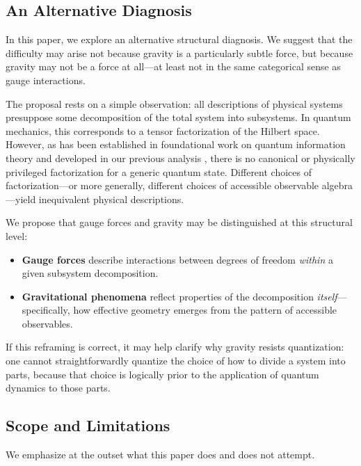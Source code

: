 \documentclass[12pt,a4paper]{article}
\begin{document}
\subsection{An Alternative Diagnosis}

In this paper, we explore an alternative structural diagnosis. We suggest that the difficulty may arise not because gravity is a particularly subtle force, but because gravity may not be a force at all—at least not in the same categorical sense as gauge interactions.

The proposal rests on a simple observation: all descriptions of physical systems presuppose some decomposition of the total system into subsystems. In quantum mechanics, this corresponds to a tensor factorization of the Hilbert space. However, as has been established in foundational work on quantum information theory \cite{Zanardi2001,Zanardi2004} and developed in our previous analysis \cite{Liu2026PaperA}, there is no canonical or physically privileged factorization for a generic quantum state. Different choices of factorization—or more generally, different choices of accessible observable algebra—yield inequivalent physical descriptions.

We propose that gauge forces and gravity may be distinguished at this structural level:

\begin{sloppypar}
\begin{itemize}
    \item \textbf{Gauge forces} describe interactions between degrees of freedom \emph{within} a given subsystem decomposition.
    \item \textbf{Gravitational phenomena} reflect properties of the decomposition \emph{itself}---specifically, how effective geometry emerges from the pattern of accessible observables.
\end{itemize}
\end{sloppypar}

If this reframing is correct, it may help clarify why gravity resists quantization: one cannot straightforwardly quantize the choice of how to divide a system into parts, because that choice is logically prior to the application of quantum dynamics to those parts.

\subsection{Scope and Limitations}

We emphasize at the outset what this paper does and does not attempt.
\end{document}
